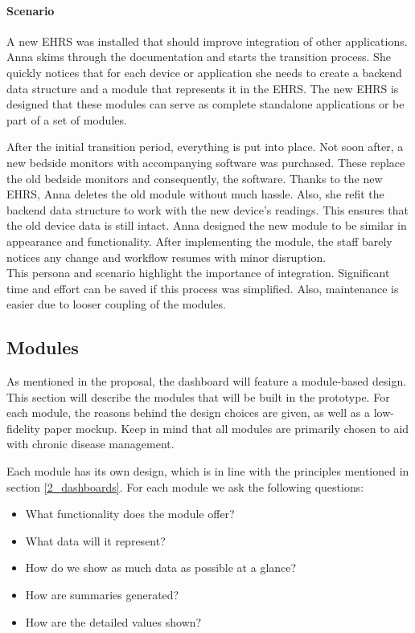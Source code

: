         \paragraph{Scenario} A new EHRS was installed that should improve integration of other applications. Anna skims through the documentation and starts the transition process. She quickly notices that for each device or application she needs to create a backend data structure and a module that represents it in the EHRS. The new EHRS is designed that these modules can serve as complete standalone applications or be part of a set of modules.

        After the initial transition period, everything is put into place. Not soon after, a new bedside monitors with accompanying software was purchased. These replace the old bedside monitors and consequently, the software. Thanks to the new EHRS, Anna deletes the old module without much hassle. Also, she refit the backend data structure to work with the new device's readings. This ensures that the old device data is still intact. Anna designed the new module to be similar in appearance and functionality. After implementing the module, the staff barely notices any change and workflow resumes with minor disruption.\\

        \noindent This persona and scenario highlight the importance of integration. Significant time and effort can be saved if this process was simplified. Also, maintenance is easier due to looser coupling of the modules.

    \subsection{Modules} \label{design_modules}
    
    As mentioned in the proposal, the dashboard will feature a module-based design. This section will describe the modules that will be built in the prototype. For each module, the reasons behind the design choices are given, as well as a low-fidelity paper mockup. Keep in mind that all modules are primarily chosen to aid with chronic disease management.

    Each module has its own design, which is in line with the principles mentioned in section \ref{2_dashboards}. For each module we ask the following questions:
    \begin{itemize}
        \item What functionality does the module offer?
        \item What data will it represent?
        \item How do we show as much data as possible at a glance?
        \item How are summaries generated?
        \item How are the detailed values shown?
    \end{itemize}

